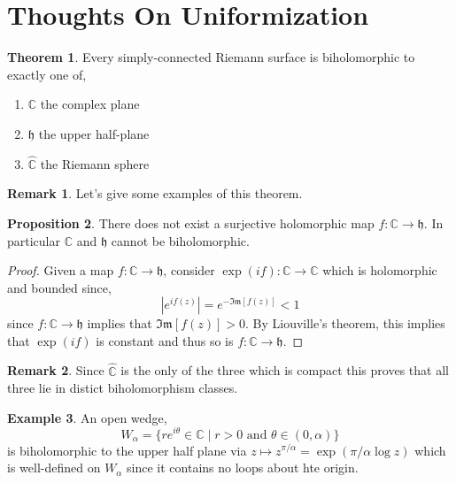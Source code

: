 \documentclass[12pt]{extarticle}
\renewcommand{\Im}[1]{\mathrm{Im}(#1)}
\theoremstyle{definition}
\newtheorem{theorem}{Theorem}[section]
\newtheorem{proposition}[theorem]{Proposition}
\newtheorem{example}[theorem]{Example}
\newtheorem{remark}{Remark}
\newcommand{\h}{\mathfrak{h}}
\newcommand{\C}{\mathbb{C}}
\begin{document}
\tableofcontents

\section{Thoughts On Uniformization}

\renewcommand{\Im}[1]{\mathfrak{Im} \left[ #1 \right]}
\renewcommand{\Re}[1]{\mathfrak{Re} \left[ #1 \right]}


\begin{theorem}
Every simply-connected Riemann surface is biholomorphic to exactly one of,
\begin{enumerate}
\item $\C$ the complex plane
\item $\h$ the upper half-plane
\item $\hat{\C}$ the Riemann sphere
\end{enumerate}
\end{theorem}

\begin{remark}
Let's give some examples of this theorem.
\end{remark}

\begin{proposition}
There does not exist a surjective holomorphic map $f : \C \to \h$. In particular $\C$ and $\h$ cannot be biholomorphic.
\end{proposition}

\begin{proof}
Given a map $f : \C \to \h$, consider $\exp{(i f)} : \C \to \C$ which is holomorphic and bounded since,
\[ | e^{if(z)}| = e^{-\Im{f(z)}} < 1 \]
since $f : \C \to \h$ implies that $\Im{f(z)} > 0$. By Liouville's theorem, this implies that $\exp{(if)}$ is constant and thus so is $f : \C \to \h$. 
\end{proof}

\begin{remark}
Since $\hat{\C}$ is the only of the three which is compact this proves that all three lie in distict biholomorphism classes.
\end{remark}

\begin{example}
An open wedge,
\[ W_\alpha = \{ r e^{i \theta} \in \C \mid r > 0 \text{ and } \theta \in (0, \alpha) \} \]
is biholomorphic to the upper half plane via $z \mapsto z^{\pi /\alpha} = \exp{(\pi / \alpha \log{z})}$ which is well-defined on $W_\alpha$ since it contains no loops about hte origin.  
\end{example}
\end{document}
